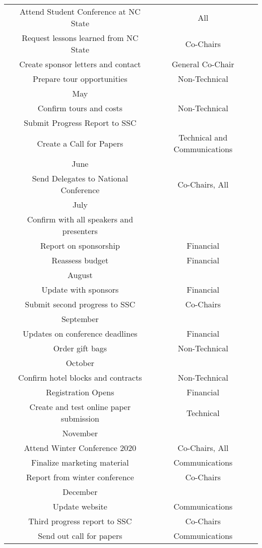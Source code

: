 \begin{center}
\begin{longtable}{c |  c  c}
\hline\hline
& Attend Student Conference at NC State& All\\
& Request lessons learned from NC State& Co-Chairs\\
& Create sponsor letters and contact & General Co-Chair\\
& Prepare tour opportunities& Non-Technical\\
\hline\hline
&May&\\
\hline\hline
& Confirm tours and costs& Non-Technical\\
& Submit Progress Report to SSC& \\
& Create a Call for Papers & Technical and Communications\\
\hline\hline
&June&\\
\hline\hline
& Send Delegates to National Conference& Co-Chairs, All\\
\hline\hline
&July&\\
\hline\hline
& Confirm with all speakers and presenters& \\
& Report on sponsorship& Financial\\
& Reassess budget& Financial\\
\hline\hline
&August&\\
\hline\hline
& Update with sponsors& Financial\\
& Submit second progress to SSC& Co-Chairs\\
\hline\hline
&September&\\
\hline\hline
& Updates on conference deadlines& Financial\\
& Order gift bags& Non-Technical\\
\hline\hline
&October&\\
\hline\hline
& Confirm hotel blocks and contracts& Non-Technical\\
& Registration Opens& Financial\\
& Create and test online paper submission& Technical\\
\hline\hline
&November&\\
\hline\hline
& Attend Winter Conference 2020& Co-Chairs, All\\
& Finalize marketing material& Communications\\
& Report from winter conference & Co-Chairs\\
\hline\hline
&December&\\
\hline\hline
& Update website & Communications \\
& Third progress report to SSC& Co-Chairs\\
& Send out call for papers& Communications\\

\end{longtable}
\end{center}
